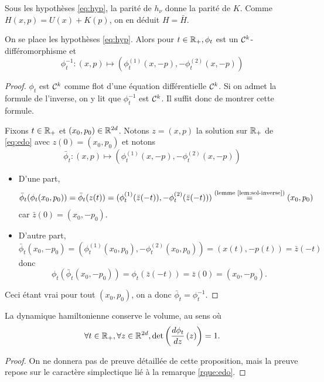 \documentclass[10pt,a4paper]{article}
\begin{document}
\begin{Rque}\label{rque:Hbar}
	Sous les hypothèses \eqref{eq:hyp}, la parité de $h_\nu$ donne la parité de $K$. Comme $H(x,p) = U(x)+K(p)$, on en déduit $H = \bar H$.
\end{Rque}

\begin{Prop}[réversibilité]\label{prop:rev}
	On se place les hypothèses \eqref{eq:hyp}. Alors pour $t \in \mathbb{R}_+, \phi_t$ est un $\mathcal{C}^k$-différomorphisme et
	$$
	\phi_t^{-1} : (x,p) \mapsto (\phi_t^{(1)}(x, -p), - \phi_t^{(2)}(x, -p))
	$$
\end{Prop}
\begin{proof}
	$\phi_t$ est $\mathcal{C}^k$ comme flot d'une équation différentielle $\mathcal{C}^k$. Si on admet la formule de l'inverse, on y lit que $\phi_t^{-1}$ est $\mathcal{C}^k$. Il suffit donc de montrer cette formule.

	Fixons $t \in \mathbb{R}_+$ et $(x_0,p_0) \in \mathbb{R}^{2d}$. Notons $z=(x,p)$ la solution sur $\mathbb{R}_+$ de \eqref{eq:edo} avec $z(0) = (x_0,p_0)$ et notons
	$$
	\bar \phi_t : (x,p) \mapsto (\phi_t^{(1)}(x, -p), - \phi_t^{(2)}(x, -p))
	$$
        \begin{itemize}
		\item D'une part,
		$$
		\bar \phi_t(\phi_t(x_0,p_0)) = \bar \phi_t(z(t)) = (\phi_t^{(1)}(\bar z(-t)), - \phi_t^{(2)}(\bar z(-t))) \overset{\text{(lemme \ref{lem:sol-inverse})}}{=} (x_0, p_0)
		$$
		car $\bar z(0) = (x_0,-p_0)$.

		\item D'autre part,
		$$
		\bar \phi_t(x_0,-p_0) = (\phi_t^{(1)}(x_0, p_0), - \phi_t^{(2)}(x_0, p_0)) = (x(t),-p(t)) = \bar z(-t)
		$$
		donc
		$$
		\phi_t (\bar \phi_t(x_0,-p_0)) = \phi_t(\bar z(-t)) = \bar{z}(0) = (x_0,-p_0).
		$$
	\end{itemize}
	Ceci étant vrai pour tout $(x_0,p_0)$, on a donc $\bar \phi_t = \phi_t^{-1}$.
\end{proof}


\begin{Prop}\label{prop:vol}
	La dynamique hamiltonienne conserve le volume, au sens où
	$$
	\forall t \in \mathbb{R}_+, \forall z \in \mathbb{R}^{2d}, \det \left( \frac{d \phi_t}{d z} \left( z \right) \right) = 1.
	$$
\end{Prop}
\begin{proof}
On ne donnera pas de preuve détaillée de cette proposition, mais la preuve repose sur le caractère simplectique lié à la remarque \ref{rque:edo}.
\end{proof}
\end{document}
